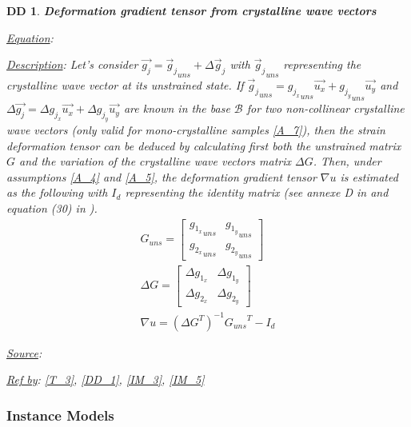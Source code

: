 \documentclass[12pt]{article}
\newtheorem{DD}{DD}
\begin{document}
\begin{DD}
\label{DD_3}
\noindent\colorbox{shadecolorDD}{\normalfont \textbf{Deformation gradient tensor from crystalline wave vectors}}
\normalfont
\item \underline{Equation}: 
\item \underline{Description}: Let's consider $\overrightarrow{g_j} = {\overrightarrow{g}_{j}}_{uns} + \Delta \overrightarrow{g}_j$ with ${\overrightarrow{g}_{j}}_{uns}$ representing the crystalline wave vector at its unstrained state. If ${\overrightarrow{g}_{j}}_{uns}={g_{j_{x}}}_{uns}\overrightarrow{u_{x}}+{g_{j_{y}}}_{uns}\overrightarrow{u_{y}}$ and $\Delta \overrightarrow{g_{j}}=\Delta g_{j_{x}}\overrightarrow{u_{x}}+\Delta g_{j_{y}}\overrightarrow{u_{y}}$ are known in the base $\mathcal{B}$ for two non-collinear crystalline wave vectors (only valid for mono-crystalline samples \cref{A_7}), then the strain deformation tensor can be deduced by calculating first both the unstrained matrix $G$ and the variation of the crystalline wave vectors matrix $\Delta G$. Then, under assumptions \cref{A_4} and \cref{A_5}, the deformation gradient tensor $\nabla u$ is estimated as the following with $I_{d}$ representing the identity matrix (see annexe D in \cite{Hytch1998} and equation (30) in \cite{Rouviere2005}). 
\begin{equation}
\begin{gathered}
	G_{uns} =
	\begin{bmatrix}
	{g_{1_{x}}}_{uns} & {g_{1_{y}}}_{uns} \\
	{g_{2_{x}}}_{uns} & {g_{2_{y}}}_{uns} 
	\end{bmatrix} \\
	\Delta G =
	\begin{bmatrix}
	\Delta g_{1_{x}} & \Delta g_{1_{y}} \\
	\Delta g_{2_{x}} & \Delta g_{2_{y}} 
	\end{bmatrix} \\
\nabla u = ({\Delta G}^{T})^{-1}{G_{uns}}^{T}-I_{d}
\end{gathered}
\label{eq:strain_1}
\end{equation}
\item \underline{Source}: \cite{Hytch1998,Rouviere2005}
\item \underline{Ref by}: \cref{T_3}, \cref{DD_1}, \cref{IM_3}, \cref{IM_5}
\end{DD}

\subsubsection{Instance Models} \label{sec_instance}    
\end{document}
